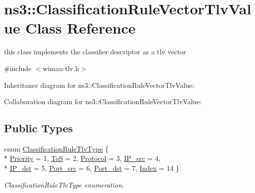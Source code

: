 \hypertarget{classns3_1_1ClassificationRuleVectorTlvValue}{}\section{ns3\+:\+:Classification\+Rule\+Vector\+Tlv\+Value Class Reference}
\label{classns3_1_1ClassificationRuleVectorTlvValue}


this class implements the classifier descriptor as a tlv vector  




{\ttfamily \#include $<$wimax-\/tlv.\+h$>$}



Inheritance diagram for ns3\+:\+:Classification\+Rule\+Vector\+Tlv\+Value\+:


Collaboration diagram for ns3\+:\+:Classification\+Rule\+Vector\+Tlv\+Value\+:
\subsection*{Public Types}
\begin{DoxyCompactItemize}
\item 
enum \hyperlink{classns3_1_1ClassificationRuleVectorTlvValue_a9945c44c631de44d3b9c8dc9560cb820}{Classification\+Rule\+Tlv\+Type} \{ \\*
\hyperlink{classns3_1_1ClassificationRuleVectorTlvValue_a9945c44c631de44d3b9c8dc9560cb820afb33cbae5e7663e0ffec4d0ec84520ec}{Priority} = 1, 
\hyperlink{classns3_1_1ClassificationRuleVectorTlvValue_a9945c44c631de44d3b9c8dc9560cb820a89ce8792247ffb6bf26a8493de8f899d}{ToS} = 2, 
\hyperlink{classns3_1_1ClassificationRuleVectorTlvValue_a9945c44c631de44d3b9c8dc9560cb820ac596932971436a37dd565fa950f1e9df}{Protocol} = 3, 
\hyperlink{classns3_1_1ClassificationRuleVectorTlvValue_a9945c44c631de44d3b9c8dc9560cb820a25dcc2e936d897953dd8fced923caa83}{I\+P\+\_\+src} = 4, 
\\*
\hyperlink{classns3_1_1ClassificationRuleVectorTlvValue_a9945c44c631de44d3b9c8dc9560cb820ab9d2ecb509415d656b9fecb6470a11d5}{I\+P\+\_\+dst} = 5, 
\hyperlink{classns3_1_1ClassificationRuleVectorTlvValue_a9945c44c631de44d3b9c8dc9560cb820a9d8e7721917dc3136e20ca00dbe4b0ad}{Port\+\_\+src} = 6, 
\hyperlink{classns3_1_1ClassificationRuleVectorTlvValue_a9945c44c631de44d3b9c8dc9560cb820a20c3a1510829e04b8f8857b536b77471}{Port\+\_\+dst} = 7, 
\hyperlink{classns3_1_1ClassificationRuleVectorTlvValue_a9945c44c631de44d3b9c8dc9560cb820a411a276461e9e48f9bc54fecce932f54}{Index} = 14
 \}\begin{DoxyCompactList}\small\item\em Classification\+Rule\+Tlv\+Type enumeration. \end{DoxyCompactList}
\end{DoxyCompactItemize}
